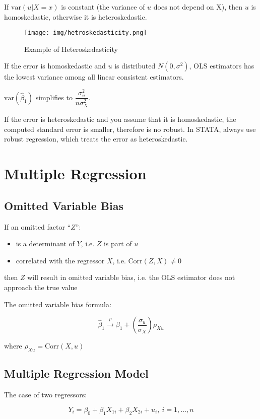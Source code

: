 \documentclass{article}
\begin{document}
If $\text{var}\left(u|X=x\right)$ is constant (the variance of $u$ does not depend on X),
then $u$ is homoskedastic, otherwise it is heteroskedastic.

\begin{figure}[H]
	\centering
	\texttt{[image: img/hetroskedasticity.png]}
	\caption{Example of Heteroskedasticity}
\end{figure}

If the error is homoskedastic and $u$ is distributed $N(0, \sigma^2)$,
OLS estimators has the lowest variance among all linear consistent estimators.

$\text{var}(\hat{\beta}_1)$ simplifies to $\dfrac{\sigma_u^2}{n\sigma_X^2}$.

If the error is heteroskedastic and you assume that it is homoskedastic,
the computed standard error is smaller, therefore is no robust.
In STATA, always use robust regression, which treats the error as heteroskedastic.

\section{Multiple Regression}

\subsection{Omitted Variable Bias}

If an omitted factor ``$Z$'':
\begin{itemize}
	\item is a determinant of $Y$, i.e. $Z$ is part of $u$
	\item correlated with the regressor $X$, i.e. $\text{Corr}(Z,X) \neq 0$
\end{itemize}
then $Z$ will result in omitted variable bias,
i.e. the OLS estimator does not approach the true value

The omitted variable bias formula:

\[
	\hat{\beta}_1 \xrightarrow{p} \beta_1 + \left(\dfrac{\sigma_u}{\sigma_X}\right)\rho_{Xu}
\]

where $\rho_{Xu} = \text{Corr}(X, u)$

\subsection{Multiple Regression Model}

The case of two regressors:

\[
	Y_i = \beta_0 + \beta_1X_{1i} + \beta_2X_{2i} + u_i,\ i = 1, \ldots, n
\]
\end{document}
